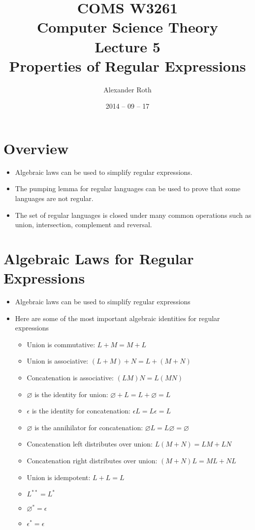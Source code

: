 \documentclass[]{article}
\begin{document}
\title{COMS W3261 \\ Computer Science Theory \\ Lecture 5\\ Properties of
Regular Expressions}
\author{Alexander Roth}
\date{2014 -- 09 -- 17}
\maketitle

\section*{Overview}
  \begin{itemize}
    \item Algebraic laws can be used to simplify regular expressions.
    \item The pumping lemma for regular languages can be used to prove that some
    languages are not regular.
    \item The set of regular languages is closed under many common operations
    such as union, intersection, complement and reversal.
  \end{itemize}

\section{Algebraic Laws for Regular Expressions}
  \begin{itemize}
    \item Algebraic laws can be used to simplify regular expressions
    \item Here are some of the most important algebraic identities for regular
    expressions
      \begin{itemize}
        \item Union is commutative: $L + M = M + L$
        \item Union is associative: $(L + M) + N = L + (M + N)$
        \item Concatenation is associative: $(LM)N = L(MN)$
        \item $\varnothing$ is the identity for union: $\varnothing + L = L +
        \varnothing = L$
        \item $\epsilon$ is the identity for concatenation: $\epsilon{L} = L
        \epsilon = L$
        \item $\varnothing$ is the annihilator for concatenation: $
        \varnothing{L} = L\varnothing = \varnothing$
        \item Concatenation left distributes over union: $L(M + N) = LM + LN$
        \item Concatenation right distributes over union: $(M + N)L = ML + NL$
        \item Union is idempotent: $L + L = L$
        \item $L^{**} = L^*$
        \item $\varnothing^{*} = \epsilon$
        \item $\epsilon^* = \epsilon$
      \end{itemize}
  \end{itemize}
\end{document}
